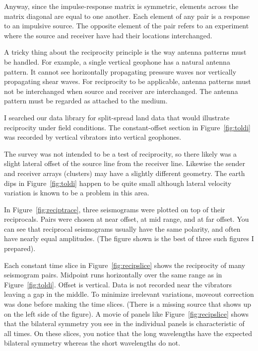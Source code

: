 \par
Anyway, since the
impulse-response matrix is symmetric,
elements across the matrix diagonal are equal to one another.
Each element of any pair is a response to an impulsive source.
The opposite element of the pair refers to
an experiment where the source and receiver
have had their locations interchanged.

\par
A tricky thing about the reciprocity principle
is the way antenna patterns must be handled.
For example, a single vertical geophone has a natural antenna pattern.
It cannot see horizontally propagating pressure waves nor vertically
propagating shear waves.
For reciprocity to be applicable,
antenna patterns must not be interchanged
when source and receiver are interchanged.
The antenna pattern must be regarded as attached to the medium.

\par
I searched our data library for split-spread land data that
would illustrate reciprocity under field conditions.
The constant-offset section in Figure~\ref{fig:toldi} was recorded
by vertical vibrators into vertical geophones.

The survey was not intended to be a test of reciprocity,
so there likely was a slight lateral offset of the source line
from the receiver line.
Likewise the sender and receiver arrays (clusters)
may have a slightly different geometry.
The earth dips in Figure~\ref{fig:toldi} happen to be quite small
although lateral velocity variation
is known to be a problem in this area.
\par
In Figure~\ref{fig:reciptrace},
three seismograms were plotted on top of their reciprocals.
Pairs were chosen at near offset, at mid range,
and at far offset.
You can see that reciprocal seismograms usually have the same polarity,
and often have nearly equal amplitudes.
(The figure shown is the best of three such figures I prepared).
\par
Each constant time slice in Figure~\ref{fig:recipslice}
shows the reciprocity of many seismogram pairs.
Midpoint runs horizontally over the same range as in Figure~\ref{fig:toldi}.
Offset is vertical.
Data is not recorded near the vibrators
leaving a gap in the middle.
To minimize irrelevant variations,
moveout correction was done before making the time slices.
(There is a missing source that shows up on the left side of the figure).
A movie of panels like Figure~\ref{fig:recipslice} shows that
the bilateral symmetry you see in the individual panels
is characteristic of all times.
On these slices, you notice that the long wavelengths
have the expected bilateral symmetry
whereas the short wavelengths do not.

